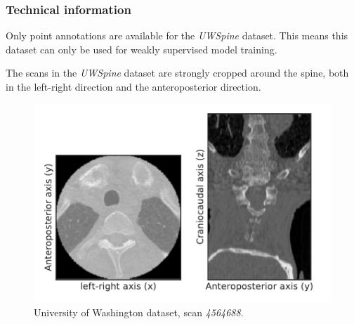 \subsubsection{Technical information}

Only point annotations are available for the \textit{UWSpine} dataset. 
This means this dataset can only be used for weakly supervised model training.

The scans in the \textit{UWSpine} dataset are strongly cropped around the spine, both in the left-right direction and the anteroposterior direction.

\begin{figure}
    \centering
    \includegraphics[width=.95\textwidth]{automated_graphs/UW_4564688.pdf}
    \caption{University of Washington dataset, scan \textit{4564688}. \label{fig:UW_4564688}}
\end{figure}

